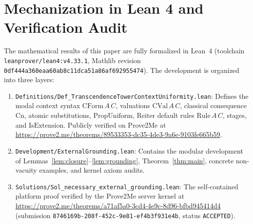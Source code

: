 \documentclass[11pt]{article}
\theoremstyle{plain}
\theoremstyle{definition}
\theoremstyle{remark}
\newcommand{\Cn}{\mathrm{Cn}}
\newcommand{\CForm}{\mathrm{CForm}}
\newcommand{\CVal}{\mathrm{CVal}}
\newcommand{\Rule}{\mathrm{Rule}}
\newcommand{\PropUniform}{\mathrm{PropUniform}}
\newcommand{\IsExtension}{\mathrm{IsExtension}}
\begin{document}
\section{Mechanization in Lean 4 and Verification Audit}\label{sec:formal}

The mathematical results of this paper are fully formalized in Lean~4
(toolchain \texttt{leanprover/\allowbreak lean4:v4.33.1}, Mathlib revision
\texttt{0df444a360eaa60ab8c11dca\allowbreak 51a86af692955474}). The development is organized
into three layers:
\begin{enumerate}[leftmargin=1.5em]
  \item \texttt{Definitions/\allowbreak Def\_TranscendenceTower\allowbreak ContextUniformity.lean}:
    Defines the modal context syntax $\CForm\,A\,C$, valuations $\CVal\,A\,C$,
    classical consequence $\Cn$, atomic substitutions, $\PropUniform$, Reiter
    default rules $\Rule\,A\,C$, stages, and $\IsExtension$. Publicly verified on
    Prove2Me at \url{https://prove2.me/theorems/89533353-dc35-4de3-9a6e-9103fe665b59}.
  \item \texttt{Development/\allowbreak ExternalGrounding.lean}: Contains the modular
    development of Lemmas~\ref{lem:closure}--\ref{lem:grounding},
    Theorem~\ref{thm:main}, concrete non-vacuity examples, and kernel axiom
    audits.
  \item \texttt{Solutions/\allowbreak Sol\_necessary\_external\_grounding.lean}: The
    self-contained platform proof verified by the Prove2Me server kernel at
    \url{https://prove2.me/theorems/a71af5a0-3cd4-4e9c-8d96-bfbd945414d4}
    (submission \texttt{8746169b-208f-452c-9e81-\allowbreak ef4b3f931e4b}, status
    \texttt{ACCEPTED}).
\end{enumerate}
\end{document}
